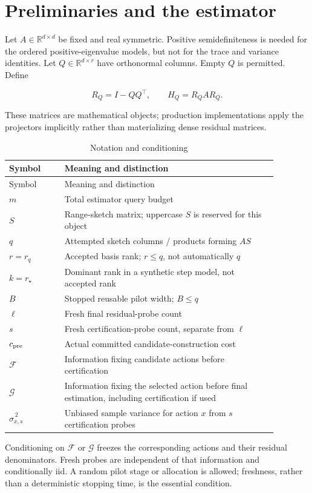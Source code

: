 \section{Preliminaries and the estimator}\label{sec:preliminaries}
Let $A\in\mathbb R^{d\times d}$ be fixed and real symmetric. Positive semidefiniteness is needed for the ordered positive-eigenvalue models, but not for the trace and variance identities. Let $Q\in\mathbb R^{d\times r}$ have orthonormal columns. Empty $Q$ is permitted. Define


\begin{equation}
R_Q=I-QQ^\top,\qquad H_Q=R_QAR_Q.
\end{equation}


These matrices are mathematical objects; production implementations apply the projectors implicitly rather than materializing dense residual matrices.


{\small
\begin{longtable}{@{}>{\raggedright\arraybackslash}p{0.1848\linewidth}>{\raggedright\arraybackslash}p{0.6952\linewidth}@{}}
\caption{Notation and conditioning}\label{tab:auto1}\\
\toprule
Symbol & Meaning and distinction \\
\midrule
\endfirsthead
\toprule
Symbol & Meaning and distinction \\
\midrule
\endhead
$m$ & Total estimator query budget \\
$S$ & Range-sketch matrix; uppercase $S$ is reserved for this object \\
$q$ & Attempted sketch columns / products forming $AS$ \\
$r=r_q$ & Accepted basis rank; $r\le q$, not automatically $q$ \\
$k=r_\star$ & Dominant rank in a synthetic step model, not accepted rank \\
$B$ & Stopped reusable pilot width; $B\le q$ \\
$\ell$ & Fresh final residual-probe count \\
$s$ & Fresh certification-probe count, separate from $\ell$ \\
$c_{\rm pre}$ & Actual committed candidate-construction cost \\
$\mathcal F$ & Information fixing candidate actions before certification \\
$\mathcal G$ & Information fixing the selected action before final estimation, including certification if used \\
$\widehat\sigma_{x,s}^{\,2}$ & Unbiased sample variance for action $x$ from $s$ certification probes \\
\bottomrule
\end{longtable}
}
Conditioning on $\mathcal F$ or $\mathcal G$ freezes the corresponding actions and their residual denominators. Fresh probes are independent of that information and conditionally iid. A random pilot stage or allocation is allowed; freshness, rather than a deterministic stopping time, is the essential condition.

